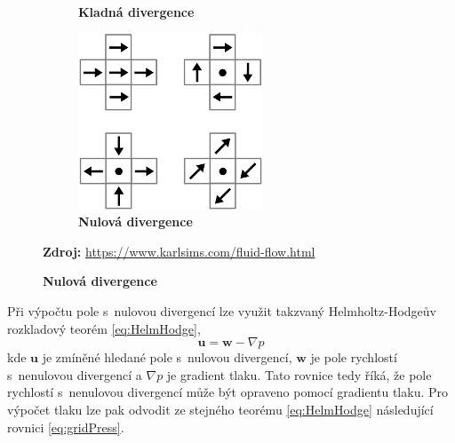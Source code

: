 \begin{figure}[h]
\begin{subfigure}{.3\textwidth}
		\caption{\textbf{Kladná divergence}}
		\label{fig:divNeg}
	\end{subfigure}
	\begin{subfigure}{.3\textwidth}
		\centering
		\includegraphics[width=0.8\linewidth]{obrazky-figures/div-zero.png}
		\caption{\textbf{Nulová divergence}}
		\label{fig:divZero}
	\end{subfigure}
	\textbf{Zdroj:} \url{https://www.karlsims.com/fluid-flow.html}
	\label{fig:div}
\end{figure}

\newpage

Při výpočtu pole s~nulovou divergencí lze využit takzvaný Helmholtz-Hodgeův rozkladový teorém \ref{eq:HelmHodge},
\begin{equation}
	\mathbf{u} = \mathbf{w} - \nabla p
	\label{eq:HelmHodge}
\end{equation}
kde $\mathbf{u}$ je zmíněné hledané pole s~nulovou divergencí, $\mathbf{w}$ je pole rychlostí s~nenulovou divergencí a $\nabla p$ je gradient tlaku. Tato rovnice tedy říká, že pole rychlostí s~nenulovou divergencí může být opraveno pomocí gradientu tlaku. Pro výpočet tlaku lze pak odvodit ze stejného teorému \ref{eq:HelmHodge} následující rovnici \ref{eq:gridPress}. \cite{webglFluid}

